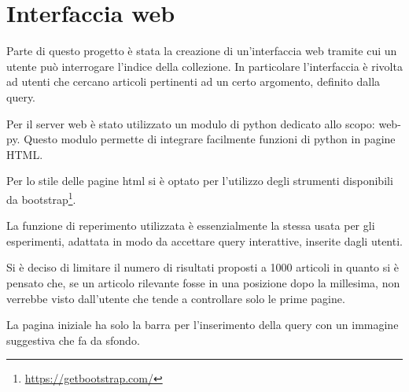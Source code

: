 \documentclass[runningheads]{llncs}
\begin{document}
\vskip 1.5in



%
%
%
\section{Interfaccia web}

Parte di questo progetto \`e stata la creazione di un'interfaccia web
tramite cui un utente pu\`o interrogare l'indice della collezione.
In particolare l'interfaccia \`e rivolta ad utenti che cercano articoli
pertinenti ad un certo argomento, definito dalla query.

Per il server web \`e stato utilizzato un modulo di python dedicato allo scopo: web-py.
Questo modulo permette di integrare facilmente funzioni di python in pagine HTML.

Per lo stile delle pagine html si \`e optato per l'utilizzo degli strumenti
disponibili da bootstrap\footnote{\url{https://getbootstrap.com/}}.

La funzione di reperimento utilizzata \`e essenzialmente la stessa usata per gli esperimenti,
adattata in modo da accettare query interattive, inserite dagli utenti.

Si \`e deciso di limitare il numero di risultati proposti a 1000 articoli in quanto si \`e pensato che, se un articolo rilevante fosse in una posizione dopo la millesima, non verrebbe visto dall'utente
che tende a controllare solo le prime pagine.

La pagina iniziale ha solo la barra per l'inserimento della query con un immagine suggestiva che fa da sfondo. 
\end{document}
